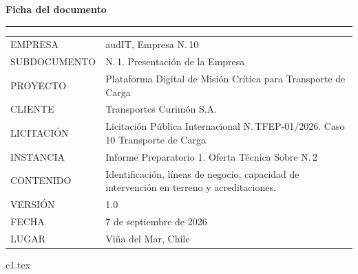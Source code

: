 \documentclass[12pt, letterpaper, table, xcdraw]{inf-pucv}
\begin{document}

\thispagestyle{folioficha}
\vspace*{1.2cm}
{\color{audITnavy}\fontsize{28}{32}\selectfont\bfseries Ficha del documento}

\vspace{10pt}
{\color{audITteal}\rule{\linewidth}{2pt}}

\vspace{22pt}
{\small
\begin{longtable}{@{}p{3.5cm}p{10.5cm}@{}}
\color{audITgris}EMPRESA & \color{black}audIT, Empresa N.\textordmasculine{}\,10 \\
\color{audITgris}SUBDOCUMENTO & \color{black}N.\textordmasculine{}\,1. Presentación de la Empresa \\
\color{audITgris}PROYECTO & \color{black}Plataforma Digital de Misión Crítica para Transporte de Carga \\
\color{audITgris}CLIENTE & \color{black}Transportes Curimón S.A. \\
\color{audITgris}LICITACIÓN & \color{black}Licitación Pública Internacional N.\textordmasculine{}\,TFEP-01/2026. Caso 10 Transporte de Carga \\
\color{audITgris}INSTANCIA & \color{black}Informe Preparatorio 1. Oferta Técnica Sobre N.\textordmasculine{}\,2 \\
\color{audITgris}CONTENIDO & \color{black}Identificación, líneas de negocio, capacidad de intervención en terreno y acreditaciones. \\
\color{audITgris}VERSIÓN & \color{black}1.0 \\
\color{audITgris}FECHA & \color{black}7 de septiembre de 2026 \\
\color{audITgris}LUGAR & \color{black}Viña del Mar, Chile \\
\end{longtable}}
\clearpage

\renewcommand{\contentsname}{Índice}
\tableofcontents
\clearpage

{c1.tex}

\clearpage
{}
{}
\printbibliography[title={Bibliografía}]
\end{document}
